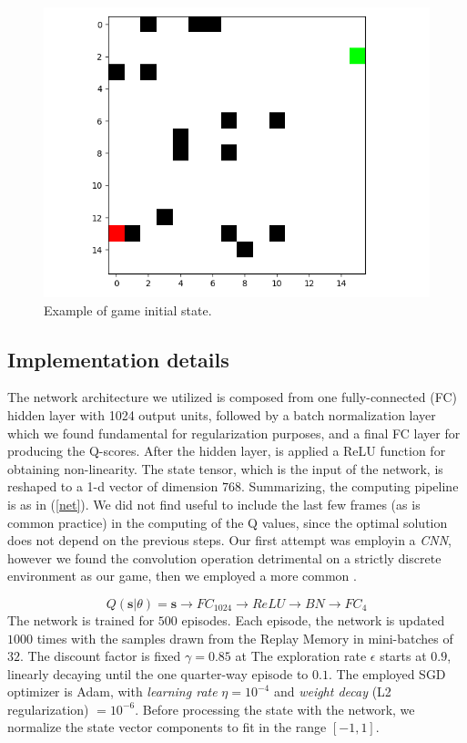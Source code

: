 \documentclass{article}
\begin{document}
\begin{figure}
	\centering
	\includegraphics[width=\textwidth]{game_example}
	\caption{Example of game initial state.}
	\label{fig:game1}
\end{figure}

\subsection{Implementation details}
The network architecture we utilized is composed from one fully-connected (FC) hidden layer with 1024 output units, followed by a batch normalization layer which we found fundamental for regularization purposes, and a final FC layer for producing the Q-scores. After the hidden layer, is applied a ReLU function for obtaining non-linearity. The state tensor, which is the input of the network, is reshaped to a 1-d vector of dimension $768$. Summarizing, the computing pipeline is as in (\ref{net}). We did not find useful to include the last few frames (as is common practice) in the computing of the Q values, since the optimal solution does not depend on the previous steps. Our first attempt was employin a \textit{CNN}, however we found the convolution operation detrimental on a strictly discrete environment as our game, then we employed a more common .

\begin{equation}
\label{net}
	Q(\textbf{s}|\theta) = \textbf{s} \rightarrow FC_{1024} \rightarrow ReLU \rightarrow BN \rightarrow FC_{4}
\end{equation}
The network is trained for $500$ episodes. Each episode, the network is updated $1000$ times with the samples drawn from the Replay Memory in mini-batches of $32$. The discount factor is fixed $\gamma=0.85$ at The exploration rate $\epsilon$ starts at $0.9$, linearly decaying until the one quarter-way episode to $0.1$. The employed SGD optimizer is Adam, with \textit{learning rate} $\eta = 10^{-4}$ and \textit{weight decay} (L2 regularization) $= 10^{-6}$.
Before processing the state with the network, we normalize the state vector components to fit in the range $[-1,1]$.
\end{document}
